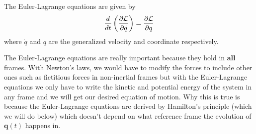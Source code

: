 \documentclass[11pt]{scrartcl}
\renewcommand\vec{\mathbf}
\begin{document}
\begin{theorem}
The Euler-Lagrange equations are given by 
\[\frac{d}{dt}\left(\pdv{\mathcal{L}}{\dot{q}}\right) = \pdv{\mathcal{L}}{q}\]
where $\dot{q}$ and $q$ are the generalized velocity and coordinate respectively.
\end{theorem}
The Euler-Lagrange equations are really important because they hold in \textbf{all} frames. With Newton's laws, we would have to modify the forces to include other ones such as fictitious forces in non-inertial frames but with the Euler-Lagrange equations we only have to write the kinetic and potential energy of the system in any frame and we will get our desired equation of motion. Why this is true is because the Euler-Lagrange equations are derived by Hamilton's principle (which we will do below) which doesn't depend on what reference frame the evolution of $\vec{q} (t)$ happens in. 
\end{document}

